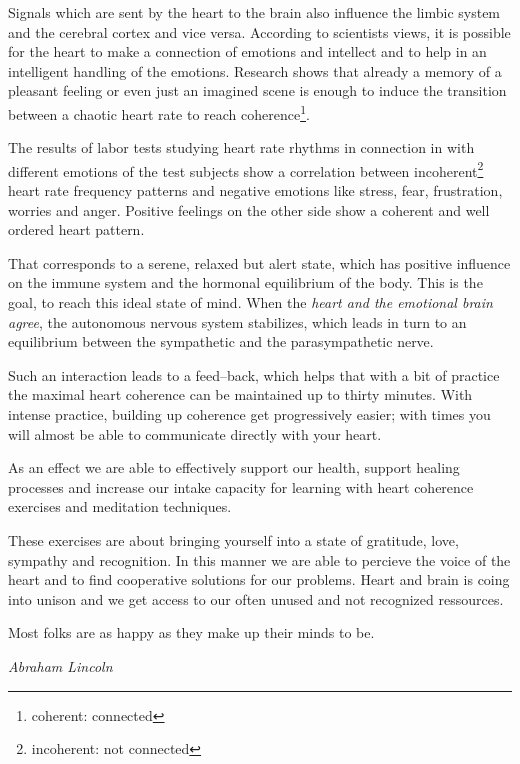 \documentclass[../main.tex]{subfiles}
\begin{document}
Signals which are sent by the heart to the brain also influence the limbic system and the cerebral cortex and vice versa.
According to scientists views, it is possible for the heart to make a connection of emotions and intellect and to help in an intelligent handling of the emotions.
Research shows that already a memory of a pleasant feeling or even just an imagined scene is enough to induce the transition between a chaotic heart rate to reach
coherence\footnote{coherent: connected}.

The results of labor tests studying heart rate rhythms in connection in with different emotions of the test subjects show a correlation between
incoherent\footnote{incoherent: not connected} heart rate frequency patterns and negative emotions like stress, fear, frustration, worries and anger.
Positive feelings on the other side show a coherent and well ordered heart pattern.

That corresponds to a serene, relaxed but alert state, which has positive influence on the immune system and the hormonal equilibrium of the body.
This is the goal, to reach this ideal state of mind.
When the \emph{heart and the emotional brain agree}, the autonomous nervous system stabilizes, which leads in turn to an equilibrium between the sympathetic and the parasympathetic nerve.

Such an interaction leads to a feed--back, which helps that with a bit of practice the maximal heart coherence can be maintained up to thirty minutes.
With intense practice, building up coherence get progressively easier; with times you will almost be able to communicate directly with your heart.

As an effect we are able to effectively support our health, support healing processes and increase our intake capacity for learning with heart coherence exercises and meditation techniques.

These exercises are about bringing yourself into a state of gratitude, love, sympathy and recognition.
In this manner we are able to percieve the voice of the heart and to find cooperative solutions for our problems.
Heart and brain is coing into unison and we get access to our often unused and not recognized ressources.

\epigraph{Most folks are as happy as they make up their minds to be.}{\textit{Abraham Lincoln}}
\end{document}
